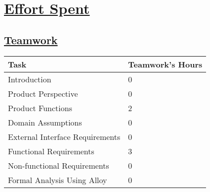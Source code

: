 \section[Effort Spent]{\hyperlink{toc}{Effort Spent}}

\subsection[Teamwork]{\hyperlink{toc}{Teamwork}}
\vspace{2mm}
\begin{center}
	\begin{tabular}{| l | p{} |}
		\hline
		\textbf{Task} & \textbf{Teamwork's Hours} \\ \hline
		Introduction & 0 \\ \hline
		Product Perspective & 0 \\ \hline
		Product Functions & 2 \\ \hline
		Domain Assumptions & 0 \\ \hline
		External Interface Requirements & 0 \\ \hline
		Functional Requirements & 3 \\ \hline
		Non-functional Requirements & 0 \\ \hline
		Formal Analysis Using Alloy & 0 \\
		\hline	
	\end{tabular}
\end{center}

